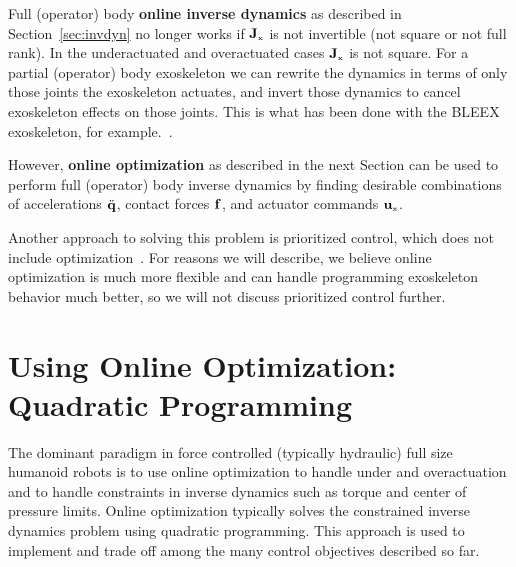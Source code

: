 \documentclass[letterpaper,12pt,fullpage]{article}
\newcommand{\myx}{{\mbox {\tiny x}}}
\begin{document}
Full (operator) body
{\bf online inverse dynamics} as described in Section~\ref{sec:invdyn}
no longer works if $\mJ_{\myx}$ is not invertible (not square or not full rank).
In the underactuated and overactuated cases $\mJ_{\myx}$ is not square. 
For a partial (operator) body
exoskeleton we can rewrite the dynamics in terms of only those
joints the exoskeleton actuates, and invert those dynamics to cancel exoskeleton
effects on those joints. This is what has been done with the BLEEX exoskeleton,
for example.~\cite{}.

However, {\bf online optimization}
as described in the next Section can be used to perform full (operator)
body inverse dynamics by
finding desirable combinations of accelerations $\ddot{{\bf q}}$, contact forces ${\bf f}$,
and actuator commands $\vu_{\myx}$.

Another approach to solving this problem is prioritized control, which does
not include optimization~\cite{}. For reasons we will describe, we believe
online optimization is much more flexible and can handle programming exoskeleton
behavior much better, so we will not discuss prioritized control further.

\section{Using Online Optimization: Quadratic Programming}
\label{sec:qp}

The dominant paradigm in force controlled (typically
hydraulic) full size humanoid robots is to use online optimization
to handle under and overactuation
and to handle constraints in inverse dynamics
such as torque and center of pressure limits.
Online optimization typically solves the constrained inverse dynamics problem
using quadratic programming.
This approach is used
to implement and trade off among the many control objectives described so far.
\end{document}
